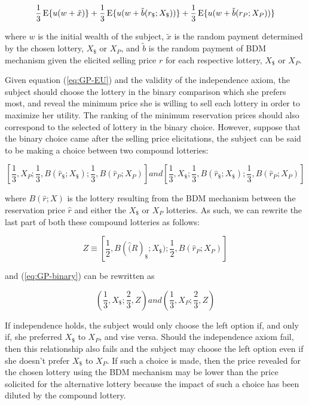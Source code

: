 \documentclass[../main.tex]{subfiles}
\begin{document}
\begin{equation}
	\label{eq:GP-EU}
	\frac{1}{3}\operatorname{E}\lbrace u (w+\tilde{x})\rbrace  + \frac{1}{3}\operatorname{E}\lbrace u (w+\tilde{b}(r_\$;X_\$))\rbrace + \frac{1}{3}\operatorname{E}\lbrace u (w+\tilde{b}(r_P;X_P))\rbrace
\end{equation}

\noindent where $w$ is the initial wealth of the subject, $\tilde{x}$ is the random payment determined by the chosen lottery, $X_\$$ or $X_P$, and $\tilde{b}$ is the random payment of BDM mechanism given the elicited selling price $r$ for each respective lottery, $X_\$$ or $X_P$.

Given equation (\ref{eq:GP-EU}) and the validity of the independence axiom, the subject should choose the lottery in the binary comparison which she prefers most, and reveal the minimum price she is willing to sell each lottery in order to maximize her utility.
The ranking of the minimum reservation prices should also correspond to the selected of lottery in the binary choice.
However, suppose that the binary choice came after the selling price elicitations, the subject can be said to be making a choice between two compound lotteries:

\begin{equation}
	\label{eq:GP-binary}
	\left[ \frac{1}{3},X_P;\frac{1}{3},B(\hat{r}_\$ ; X_\$) ; \frac{1}{3}, B(\hat{r}_P ; X_P)\right]   \textit{and}   \left[ \frac{1}{3},X_\$;\frac{1}{3},B(\hat{r}_\$ ; X_\$) ; \frac{1}{3}, B(\hat{r}_P ; X_P) \right]
\end{equation}

\noindent where $B(\hat{r};X)$ is the lottery resulting from the BDM mechanism between the reservation price $\hat{r}$ and either the $X_\$$ or $X_P$ lotteries.
As such, we can rewrite the last part of both these compound lotteries as follows:

\begin{equation}
	Z \equiv \left[ \frac{1}{2}, B(\hat(R)_\$;X_\$)  ; \frac{1}{2},B(\hat{r}_P ; X_P)  \right]
\end{equation}

\noindent and (\ref{eq:GP-binary}) can be rewritten as

\begin{equation}
	\label{eq:GP-bin-reduced}
	\left( \frac{1}{3}, X_\$ ; \frac{2}{3},Z \right) \textit{and} \left( \frac{1}{3},X_P ; \frac{2}{3},Z  \right)
\end{equation}

If independence holds, the subject would only choose the left option if, and only if, she preferred $X_\$$ to $X_P$, and vise versa.
Should the independence axiom fail, then this relationship also fails and the subject may choose the left option even if she doesn't prefer $X_\$$ to $X_P$.
If such  a choice is made, then the price revealed for the chosen lottery using the BDM mechanism may be lower than the price solicited for the alternative lottery because the impact of such a choice has been diluted by the compound lottery. 
\end{document}
